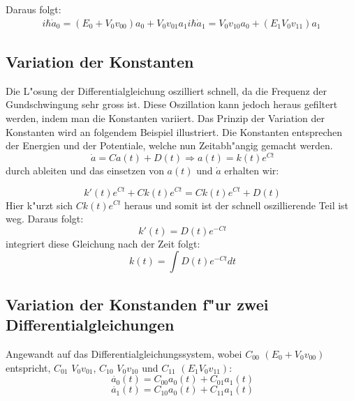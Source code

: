 \begin{refsection}
Daraus folgt:
\begin{align}
i\hbar\dot{a}_0 = (E_{0} + V_{0} v_{00}) a_{0} + V_{0} v_{01} a_{1}
i\hbar\dot{a}_1 = V_{0} v_{10} a_{0} + (E_{1} V_{0} v_{11}) a_{1}
\end{align}

\subsection{Variation der Konstanten}
Die L"osung der Differentialgleichung oszilliert schnell, da die
Frequenz der Gundschwingung sehr gross ist.
Diese Oszillation kann jedoch heraus gefiltert werden, indem man die
Konstanten variiert.
Das Prinzip der Variation der Konstanten wird an folgendem Beispiel
illustriert.
Die Konstanten entsprechen der Energien und der Potentiale, welche nun
Zeitabh"angig gemacht werden.
\[
\ \dot{a} = C a(t) + D(t) \Rightarrow a(t) = k(t) e^{C t}
\] 
durch ableiten und das einsetzen von $ a(t)$ und  $ \dot{a} $ erhalten wir:

\[
\ k'(t) e^{C t} + C k(t) e^{C t} = C k(t) e^{C t} + D(t)
\] 
Hier k"urzt sich $ C k(t) e^{C t} $ heraus und somit ist der schnell
oszillierende Teil ist weg.
Daraus folgt:
\[
\ k'(t) = D(t) e^{-C t}
\] 
integriert diese Gleichung nach der Zeit folgt:
\[
\ k(t) = \int D(t) e^{-C t} dt 
\]

\subsection{Variation der Konstanden f"ur zwei Differentialgleichungen}
Angewandt auf das Differentialgleichungssystem, wobei $C_{00}$ $(E_{0} + V_{0} v_{00})$
entspricht, $C_{01}$ $V_{0} v_{01}$, $C_{10}$ $V_{0} v_{10}$ und $C_{11}$ $(E_{1} V_{0} v_{11})$:
\[
\ \dot{a_{0}}(t) = C_{00}a_{0}(t) + C_{01}a_{1}(t)
\]
\[
\ \dot{a_{1}}(t) = C_{10}a_{0}(t) + C_{11}a_{1}(t)
\]


\end{refsection}
